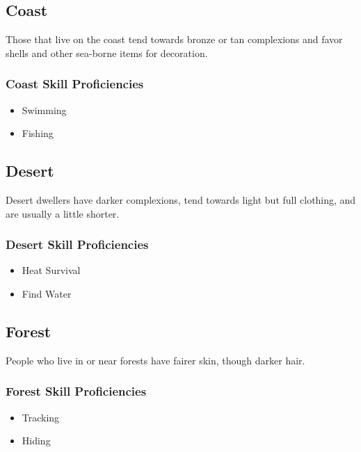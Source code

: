 \begin{multicols}{2}
\subsection{Coast}

Those that live on the coast tend towards bronze or tan complexions
and favor shells and other sea-borne items for decoration.

\subsubsection{Coast Skill Proficiencies}

\begin{itemize}
  \item Swimming
  \item Fishing
\end{itemize}

\subsection{Desert}

Desert dwellers have darker complexions, tend towards light but full
clothing, and are usually a little shorter.

\subsubsection{Desert Skill Proficiencies}

\begin{itemize}
  \item Heat Survival
  \item Find Water
\end{itemize}

\subsection{Forest}

People who live in or near forests have fairer skin, though darker
hair.

\subsubsection{Forest Skill Proficiencies}

\begin{itemize}
  \item Tracking
  \item Hiding
\end{itemize}


\end{multicols}
